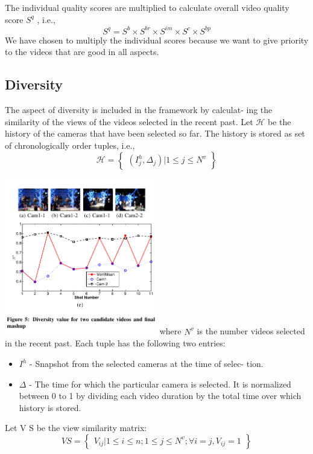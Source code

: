 \documentclass{sig-alternate}
\begin{document}
\begin{itemize}
The individual quality scores are multiplied to calculate overall
video quality score $S^q$ , i.e.,
\[S^q = S^b \times S^{br}\times S^{im}\times S^c\times S^{bp}\tag{12}\]
We have chosen to multiply the individual scores because we
want to give priority to the videos that are good in all aspects.
\end{itemize}


\subsection{Diversity}
The aspect of diversity is included in the framework by calculat-
ing the similarity of the views of the videos selected in the recent
past. Let $\mathcal{H}$ be the history of the cameras that have been selected
so far. The history is stored as set of chronologically order tuples,
i.e.,
\[\mathcal{H} = \begin{Bmatrix} (I^h_j,\Delta _j)|1 \le j \le N^v \end{Bmatrix}\tag{13}\]

\includegraphics[width=0.5\textwidth, left]{four.pdf}
where $N^v$ is the number videos selected in the recent past. Each
tuple has the following two entries:
\begin{itemize}
\item $I^h$ - Snapshot from the selected cameras at the time of selec-
tion.
\item $\Delta$ - The time for which the particular camera is selected. It
is normalized between 0 to 1 by dividing each video duration
by the total time over which history is stored.
\end{itemize}
Let V S be the view similarity matrix:
\[VS = \begin{Bmatrix} V_{ij}|1 \le i \le n; 1\le j \le N^v; \forall i = j, V_{ij} = 1 \end{Bmatrix}\tag{14}\]
\end{document}
